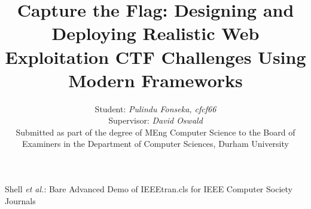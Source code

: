 \documentclass[10pt,journal,compsoc]{IEEEtran}
\begin{document}
\title{Capture the Flag: Designing and Deploying
Realistic Web Exploitation CTF Challenges Using
Modern Frameworks}


\author{Student: \textit{Pulindu Fonseka, cfcf66}\\
Supervisor: \textit{David Oswald}\\
Submitted as part of the degree of MEng Computer Science to the
Board of Examiners in the Department of Computer Sciences, Durham University
}

% 
%



%
{Shell \MakeLowercase{\textit{et al.}}: Bare Advanced Demo of IEEEtran.cls for IEEE Computer Society Journals}
% 



\end{document}
